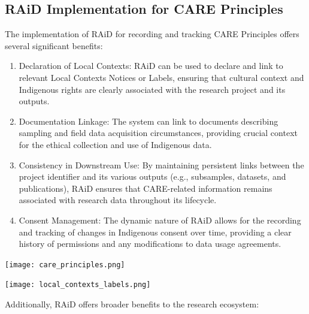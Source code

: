 \documentclass[a0,portrait]{a0poster}
\begin{document}
\begin{multicols}{2}
{}

\color{ARDCPurple}
\section*{\LARGE RAiD Implementation for CARE Principles}
\color{DarkGrey}
\large{
The implementation of RAiD for recording and tracking CARE Principles offers several significant benefits:

\begin{enumerate}
  \item Declaration of Local Contexts: RAiD can be used to declare and link to relevant Local Contexts Notices or Labels, ensuring that cultural context and Indigenous rights are clearly associated with the research project and its outputs.
  \item Documentation Linkage: The system can link to documents describing sampling and field data acquisition circumstances, providing crucial context for the ethical collection and use of Indigenous data.
  \item Consistency in Downstream Use: By maintaining persistent links between the project identifier and its various outputs (e.g., subsamples, datasets, and publications), RAiD ensures that CARE-related information remains associated with research data throughout its lifecycle.
  \item Consent Management: The dynamic nature of RAiD allows for the recording and tracking of changes in Indigenous consent over time, providing a clear history of permissions and any modifications to data usage agreements.
\end{enumerate}
    

\texttt{[image: care\_principles.png]}

\texttt{[image: local\_contexts\_labels.png]}

Additionally, RAiD offers broader benefits to the research ecosystem:

}
\end{multicols}
\end{document}

